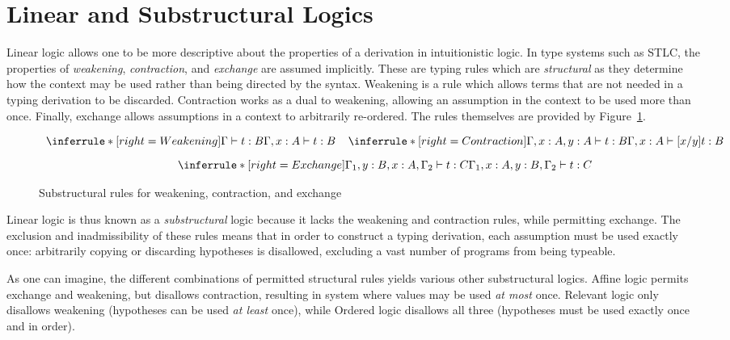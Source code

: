 \section{Linear and Substructural Logics}
Linear logic allows one to be more descriptive about the properties of a
derivation in intuitionistic logic. In type systems such as STLC, the properties
of \textit{weakening}, \textit{contraction}, and \textit{exchange} are assumed
implicitly. These are typing rules which are \textit{structural} as they
determine how the context may be used rather than being directed by the syntax.
Weakening is a rule which allows terms that are not needed in a typing
derivation to be discarded. Contraction works as a dual to weakening, allowing
an assumption in the context to be used more than once. Finally, exchange allows
assumptions in a context to arbitrarily re-ordered. The rules themselves are
provided by Figure~\ref{fig:substructural}.

\begin{figure}[H]
  \begin{gather*}
  \begin{array}{c}
    \inferrule*[right=Weakening]{\Gamma \vdash t : B}{\Gamma, x : A \vdash t : B}
    \;\;\;\;
    \inferrule*[right=Contraction]{\Gamma, x : A, y : A \vdash t : B}{\Gamma, x : A \vdash [x/y] t : B}
    \\[0.9em]
    \inferrule*[right=Exchange]{\Gamma_{1}, y : B, x : A, \Gamma_{2} \vdash t : C} {\Gamma_{1}, x : A, y : B, \Gamma_{2} \vdash t : C}
    \end{array}
  \end{gather*}
  \caption{Substructural rules for weakening, contraction, and exchange}
  \label{fig:substructural}
\end{figure}

Linear logic is thus known as a \textit{substructural} logic because it lacks
the weakening and contraction rules, while permitting exchange. The exclusion
and inadmissibility of these rules means that in order to construct a typing
derivation, each assumption must be used exactly once: arbitrarily copying or
discarding hypotheses is disallowed, excluding a vast number of programs from being
typeable. 

As one can imagine, the different combinations of permitted structural rules
yields various other substructural logics. Affine logic permits
exchange and weakening, but disallows contraction, resulting in system where
values may be used \emph{at most}  once. Relevant logic only disallows
weakening (hypotheses can be used \emph{at least} once), while Ordered logic disallows all
three (hypotheses must be used exactly once and in order).

